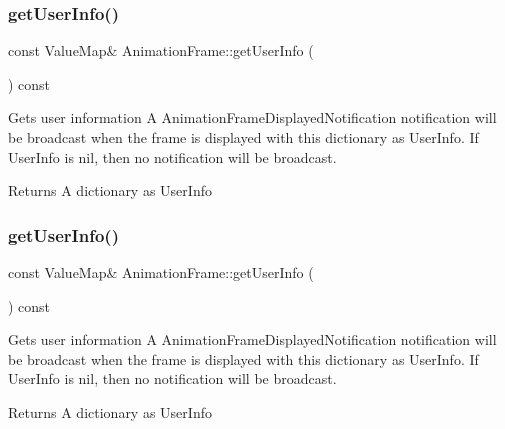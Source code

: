 \subsubsection{\texorpdfstring{get\+User\+Info()}{getUserInfo()}\hspace{0.1cm}{\footnotesize\ttfamily [1/2]}}
{\footnotesize\ttfamily const Value\+Map\& Animation\+Frame\+::get\+User\+Info (\begin{DoxyParamCaption}{ }\end{DoxyParamCaption}) const\hspace{0.3cm}{\ttfamily [inline]}}



Gets user information A Animation\+Frame\+Displayed\+Notification notification will be broadcast when the frame is displayed with this dictionary as User\+Info. If User\+Info is nil, then no notification will be broadcast. 

\begin{DoxyReturn}{Returns}
A dictionary as User\+Info 
\end{DoxyReturn}
\mbox{\label{classAnimationFrame_a8af9011b2cf3227e52134e7a42aad1dc}} 
\subsubsection{\texorpdfstring{get\+User\+Info()}{getUserInfo()}\hspace{0.1cm}{\footnotesize\ttfamily [2/2]}}
{\footnotesize\ttfamily const Value\+Map\& Animation\+Frame\+::get\+User\+Info (\begin{DoxyParamCaption}{ }\end{DoxyParamCaption}) const\hspace{0.3cm}{\ttfamily [inline]}}



Gets user information A Animation\+Frame\+Displayed\+Notification notification will be broadcast when the frame is displayed with this dictionary as User\+Info. If User\+Info is nil, then no notification will be broadcast. 

\begin{DoxyReturn}{Returns}
A dictionary as User\+Info 
\end{DoxyReturn}
\mbox{\label{classAnimationFrame_a161dcf4b8dfa1c8cb262a5f77c22dc94}} 
